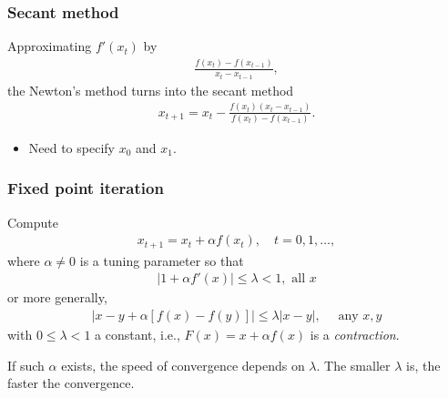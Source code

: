   \begin{frame}
  \frametitle{Secant method}
  Approximating $f'(x_t)$ by
  \begin{align*}
    \frac{f(x_t) - f(x_{t-1})}{x_t - x_{t-1}},
  \end{align*}
  the Newton's method turns into the secant method
  \begin{align*}
    x_{t+1} = x_t - \frac{f(x_t)(x_t- x_{t-1})}{f(x_t) - f(x_{t-1})}.
  \end{align*}
  \begin{itemize}
  \item Need to specify $x_0$ and $x_1$.
  \end{itemize}

\end{frame}


\begin{frame}
  \frametitle{Fixed point iteration}
  Compute
  \begin{align*}
    x_{t+1} = x_t + \alpha f(x_t), \quad t=0,1,\ldots,
  \end{align*}
  where $\alpha\not=0$ is a tuning parameter so that
  \begin{align*}
    |1+\alpha f'(x)|\le \lambda < 1, \text{ all } x
  \end{align*}
  or more generally,
  \begin{align*}
    |x - y + \alpha [f(x) - f(y)]| \le \lambda|x-y|, \quad\text{ any }
    x, y
  \end{align*}
  with $0\le \lambda < 1$ a constant, i.e., $F(x) = x+\alpha f(x)$ is
  a \emph{contraction\/}.

  If such $\alpha$ exists, the speed of convergence depends on
  $\lambda$.  The smaller $\lambda$ is, the faster the convergence.

\end{frame}



